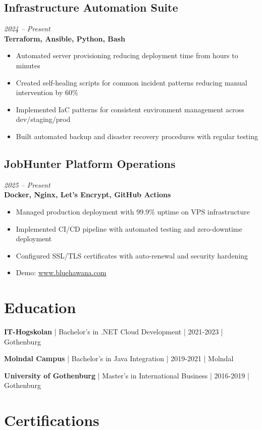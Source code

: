 \documentclass[11pt,a4paper]{article}
\begin{document}
\subsection*{Infrastructure Automation Suite}
\textit{2024 -- Present} \\
\textbf{Terraform, Ansible, Python, Bash}
\begin{itemize}[leftmargin=*, itemsep=2pt]
\item Automated server provisioning reducing deployment time from hours to minutes
\item Created self-healing scripts for common incident patterns reducing manual intervention by 60\%
\item Implemented IaC patterns for consistent environment management across dev/staging/prod
\item Built automated backup and disaster recovery procedures with regular testing
\end{itemize}

\subsection*{JobHunter Platform Operations}
\textit{2025 -- Present} \\
\textbf{Docker, Nginx, Let's Encrypt, GitHub Actions}
\begin{itemize}[leftmargin=*, itemsep=2pt]
\item Managed production deployment with 99.9\% uptime on VPS infrastructure
\item Implemented CI/CD pipeline with automated testing and zero-downtime deployment
\item Configured SSL/TLS certificates with auto-renewal and security hardening
\item Demo: \href{https://www.bluehawana.com}{www.bluehawana.com}
\end{itemize}

\section*{Education}

\textbf{IT-Hogskolan} | Bachelor's in .NET Cloud Development | 2021-2023 | Gothenburg

\textbf{Molndal Campus} | Bachelor's in Java Integration | 2019-2021 | Molndal

\textbf{University of Gothenburg} | Master's in International Business | 2016-2019 | Gothenburg

\section*{Certifications}
\end{document}
